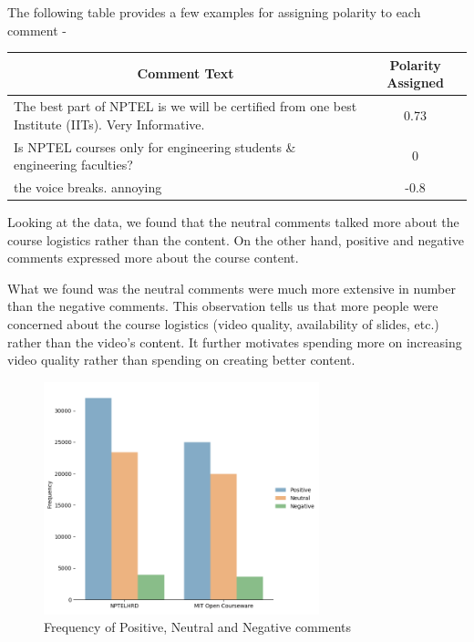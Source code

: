 \documentclass{article}
\begin{document}
The following table provides a few examples for assigning polarity to each comment - 

\begin{table}[!htbp]
\begin{adjustbox}{width=\columnwidth,center}
\begin{tabular}{|l|c|}
\hline
\multicolumn{1}{|c|}{\textbf{Comment Text}}                                                               & \textbf{Polarity Assigned} \\ \hline
The best part of NPTEL is we will be certified from one best Institute (IITs). Very Informative. & 0.73              \\ \hline
Is NPTEL courses only for engineering students \& engineering faculties?                         & 0                 \\ \hline
the voice breaks. annoying                                                                       & -0.8              \\ \hline
\end{tabular}\vspace{3mm}
\end{adjustbox}
\end{table}

 
Looking at the data, we found that the neutral comments talked more about the course logistics rather than the content. On the other hand, positive and negative comments expressed more about the course content.
 

What we found was the neutral comments were much more extensive in number than the negative comments. This observation tells us that more people were concerned about the course logistics (video quality, availability of slides, etc.)  rather than the video's content. It further motivates spending more on increasing video quality rather than spending on creating better content.
  
\begin{figure}[!htpb]
    \centering
    
    \includegraphics[width=8cm]{images/polarity_counts.png}%
    \caption{Frequency of Positive, Neutral and Negative comments}
    \label{fig:example}%
\end{figure}
\end{document}
